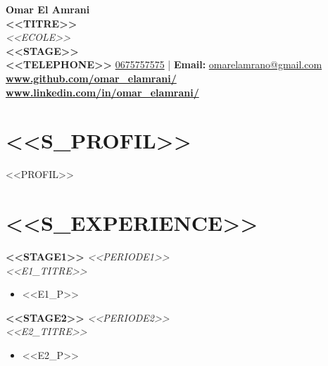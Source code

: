\documentclass[11pt,a4paper]{extarticle}
\let\oldtextbf\textbf
\renewcommand{\textbf}[1]{\textcolor{primary}{\oldtextbf{#1}}}
\begin{document}
\pagestyle{empty}
\color{bodytext}

\noindent
\begin{minipage}[c]{\textwidth}
    \centering
    {\LARGE \textbf{Omar El Amrani}}\\[1pt]
    {\large \textbf{<<TITRE>>}}\\[1pt]
    {\normalsize \textit{<<ECOLE>>}}\\[1pt]
    {\normalsize \textbf{<<STAGE>>}}\\[2pt]
    \footnotesize
    \textbf{<<TELEPHONE>>} \href{tel:0675757575}{0675757575} \quad|\quad
    \textbf{Email:} \href{mailto:omarelamrano@gmail.com}{omarelamrano@gmail.com} \\[3pt]
    {\large \textbf{\href{https://www.github.com/omar_elamrani/}{www.github.com/omar\_elamrani/}} \quad\textbar\quad \textbf{\href{https://www.linkedin.com/in/omar_elamrani/}{www.linkedin.com/in/omar\_elamrani/}}}
\end{minipage}

\vspace{1pt}

\section*{<<S_PROFIL>>}
<<PROFIL>>

\section*{<<S_EXPERIENCE>>}

\textbf{<<STAGE1>>} \hfill \textit{<<PERIODE1>>} \\
\textit{<<E1_TITRE>>}
\begin{itemize}
\item <<E1_P>>
\end{itemize}

\vspace{1pt}

\textbf{<<STAGE2>>} \hfill \textit{<<PERIODE2>>} \\
\textit{<<E2_TITRE>>}
\begin{itemize}
\item <<E2_P>>
\end{itemize}

\vspace{1pt}
\end{document}
